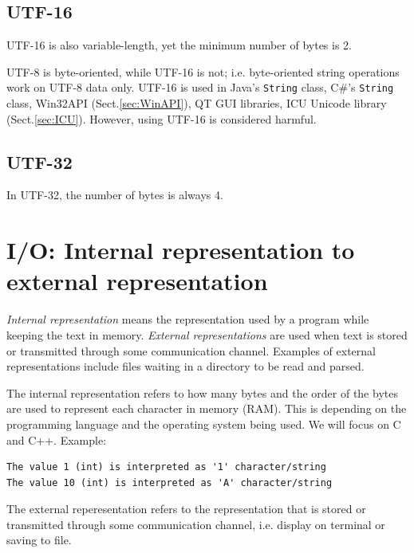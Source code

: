 \subsection{UTF-16}
 
UTF-16 is also variable-length, yet the minimum number of bytes is 2. 

UTF-8 is byte-oriented, while UTF-16 is not; i.e. byte-oriented string
operations work on UTF-8 data only. UTF-16 is used in Java's
\verb!String! class, C\#'s \verb!String! class, Win32API
(Sect.\ref{sec:WinAPI}), QT GUI libraries, ICU Unicode library
(Sect.\ref{sec:ICU}). However, using UTF-16 is considered harmful. 


\subsection{UTF-32}

In UTF-32, the number of bytes is always 4. 


\section{I/O: Internal representation to external representation}
\label{sec:internal-representation}

{\it Internal representation} means the representation used by a program while
keeping the text in memory. {\it External representations} are used when text is
stored or transmitted through some communication channel. Examples of external
representations include files waiting in a directory to be read and parsed.

The internal representation refers to how many bytes and the order of the bytes
are used to represent each character in memory (RAM). This is depending on the
programming language and the operating system being used. We will focus on C and
C++.  
Example:
\begin{verbatim}
The value 1 (int) is interpreted as '1' character/string
The value 10 (int) is interpreted as 'A' character/string
\end{verbatim}
The external reperesentation refers to the representation that is stored or
transmitted through some communication channel, i.e. display on terminal or
saving to file. 

